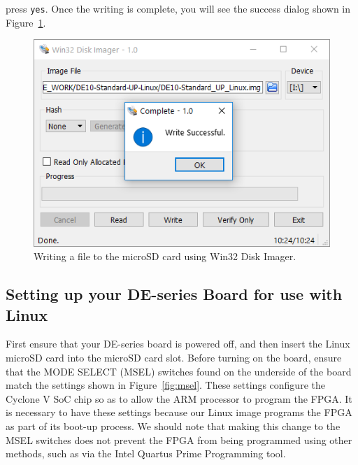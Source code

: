 \documentclass[11pt, twoside, pdftex]{article}
\begin{document}
\begin{enumerate}
press \texttt{yes}. Once the writing is complete, you will see the success dialog shown in 
Figure~\ref{fig:win32_disk_imager_4}.
\begin{figure} [h]
\begin{center}
\includegraphics[scale = 0.7]{figures/Win32DiskImager4.png}
\end{center}
\caption{Writing a file to the microSD card using Win32 Disk Imager.}
\label{fig:win32_disk_imager_4}
\end{figure}

\end{enumerate}

\subsection{Setting up your DE-series Board for use with Linux}

First ensure that your DE-series board is powered off, and then insert the Linux 
microSD card into the microSD card slot. Before turning on the board, ensure that the
MODE SELECT (MSEL) switches found on the underside of the board match the settings shown 
in Figure~\ref{fig:msel}. These settings configure the Cyclone V SoC chip so as to allow the 
ARM processor to program the FPGA. It is necessary to have these settings because our Linux 
image programs the FPGA as part of its boot-up process. We should note that making this
change to the MSEL switches does not prevent the FPGA from being programmed using other
methods, such as via the Intel Quartus Prime Programming tool.
\end{document}
